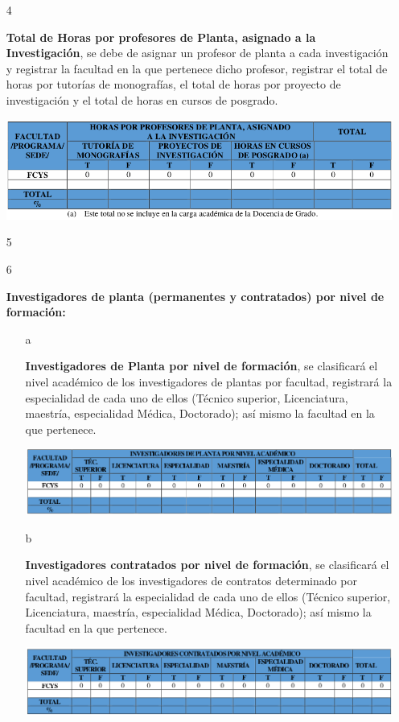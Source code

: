 \documentclass[12pt,letterpaper]{report}
\newcommand{\mb}{\vspace{0.5cm}}
\begin{document}
\begin{itemize}
\mb
\item[4]{
\textbf{Total de Horas por profesores de Planta, asignado a la Investigación}, se debe de asignar un profesor de planta a cada investigación y registrar la facultad en la que pertenece dicho profesor, registrar el total de horas por tutorías de monografías, el total de horas por proyecto de investigación y el total de horas en cursos de posgrado.

\mb
\centering
	\includegraphics[width=\textwidth]{img/tabla4.png}\par
\mb
}


\item[5]{}


\item[6]{
\textbf{Investigadores de planta (permanentes y contratados) por nivel de formación:}

\begin{itemize}
\item[a]{
\textbf{Investigadores de Planta por nivel de formación}, se clasificará el nivel académico de los investigadores de plantas por facultad, registrará la especialidad de cada uno de ellos (Técnico superior, Licenciatura, maestría, especialidad Médica, Doctorado); así mismo la facultad en la que pertenece.

\mb
\centering
	\includegraphics[width=\textwidth]{img/tabla6_1.png}\par
\mb
}


\item[b]{
\textbf{Investigadores contratados por nivel de formación}, se clasificará el nivel académico de los investigadores de contratos determinado por facultad, registrará la especialidad de cada uno de ellos (Técnico superior, Licenciatura, maestría, especialidad Médica, Doctorado); así mismo la facultad en la que pertenece.

\mb
\centering
	\includegraphics[width=\textwidth]{img/tabla6_2.png}\par
\mb
}


\end{itemize}}
\end{itemize}
\end{document}

